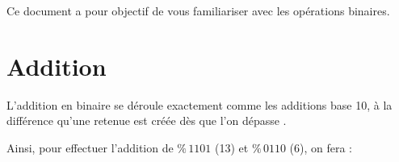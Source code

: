 \documentclass[11pt,a4paper]{article}
\begin{document}
\EncadreTitre

\bigskip


%
%

\bigskip


Ce document a pour objectif de vous familiariser avec les opérations binaires.

%

\bigskip

\vfillFirst


\section{Addition}

\medskip

L'addition en binaire se déroule exactement comme les additions base 10, à la différence qu'une retenue est créée dès que l'on dépasse  \fg{}.

\medskip

Ainsi, pour effectuer l'addition de \og $ \% \, 1101 $ \fg{} (13) et \og $ \% \, 0110 $ \fg{} (6), on fera :
\end{document}

